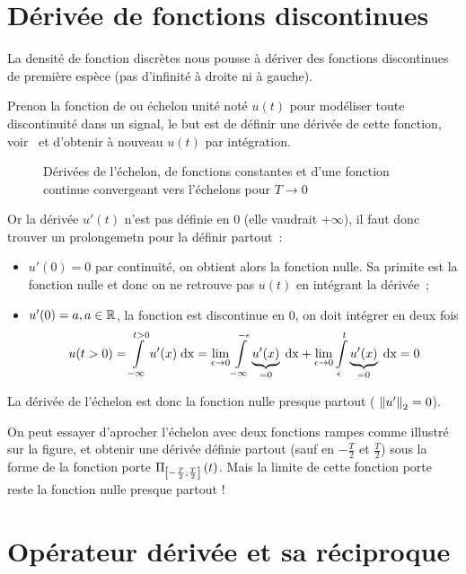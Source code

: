 \section{Dérivée de fonctions discontinues}
\label{sec:deriv_discontinues}
La densité de fonction discrètes nous pousse à dériver des fonctions
discontinues de première espèce (pas d'infinité à droite ni à gauche). 

Prenon la fonction de \Heaviside{} ou échelon unité noté $u(t)$ pour
modéliser toute discontinuité dans un signal, le but est de définir
une dérivée de cette fonction, voir~ et
d'obtenir à nouveau $u(t)$ par intégration.

\begin{figure}[ht!]
  \centering
  \caption{Dérivées de l'échelon, de fonctions constantes et d'une fonction continue convergeant vers l'échelons pour $T\to0$}
  \label{fig:derivee_echelon}
\end{figure}

Or la dérivée $u'(t)$ n'est pas définie en $0$ (elle vaudrait $+\infty$), il faut donc trouver un prolongemetn pour la définir partout~:
\begin{itemize}
\item $u'(0)=0$ par continuité, on obtient alors la fonction nulle. Sa primite est la fonction nulle et donc on ne retrouve pas $u(t)$ en intégrant la dérivée~;
\item $u'(0)=a, a\in \mathbb{R}$, la fonction est discontinue en $0$, on doit intégrer en deux fois $$u(t>0)=\int\limits_{-\infty}^{t>0}{u'(x)\;\mathrm{d{x}}}=\lim\limits_{\epsilon\to 0}\int\limits_{-\infty}^{-\epsilon}{\underbrace{u'(x)}_{=0}\;\mathrm{d{x}}}+\lim\limits_{\epsilon\to 0}\int\limits_{\epsilon}^{t}{\underbrace{u'(x)}_{=0}\;\mathrm{d{x}}}=0$$ 
\end{itemize}

La dérivée de l'échelon est donc la fonction nulle \og{} presque partout \fg{} ( $\left\|u'\right\|_2=0$).

On peut essayer d'aprocher l'échelon avec deux fonctions rampes comme
illustré sur la figure, et obtenir une dérivée définie partout (sauf
en $-\frac{T}{2}$ et $\frac{T}{2}$) sous la forme de la fonction porte
$\Pi_{\left[-\frac{T}{2} ; \frac{T}{2}\right]}\left(t\right)$. Mais la limite de cette
fonction porte reste la fonction nulle presque partout !


\section{Opérateur dérivée et sa réciproque}

